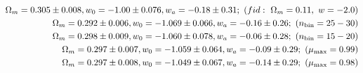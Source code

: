 \documentclass[useAMS,usenatbib]{mnras}
\begin{document}
\begin{eqnarray}
\Omega_m = 0.305 \pm 0.008, w_0 = -1.00 \pm 0.076, w_a = -0.18 \pm 0.31;\ (fid:\ \Omega_m=0.11,\ w=-2.0)\\
 \Omega_m = 0.292 \pm 0.006, w_0 = -1.069 \pm 0.066, w_a = -0.16 \pm 0.26;\ (n_{\rm bin}=25-30)\\
 \Omega_m = 0.298 \pm 0.009, w_0 = -1.060 \pm 0.078, w_a = -0.06 \pm 0.28;\ (n_{\rm bin}=15-20)\\
\Omega_m = 0.297 \pm 0.007, w_0 = -1.059 \pm 0.064, w_a = -0.09 \pm 0.29;\ (\mu_{\rm max}=0.99)\\
\Omega_m = 0.297 \pm 0.008, w_0 = -1.049 \pm 0.067, w_a = -0.14 \pm 0.29;\ (\mu_{\rm max}=0.98)\\

\end{eqnarray}
\end{document}
